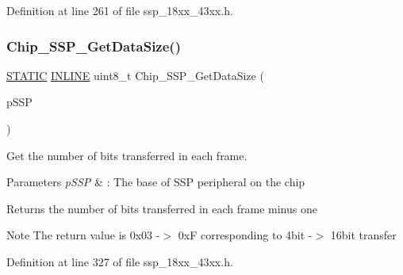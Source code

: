 Definition at line 261 of file ssp\+\_\+18xx\+\_\+43xx.\+h.

\mbox{\label{group___s_s_p__18_x_x__43_x_x_ga421d39f6094d0f335e5acbc3dd5f0b09}} 
\subsubsection{\texorpdfstring{Chip\+\_\+\+S\+S\+P\+\_\+\+Get\+Data\+Size()}{Chip\_SSP\_GetDataSize()}}
{\footnotesize\ttfamily \hyperlink{group___l_p_c___types___public___macros_ga10b2d890d871e1489bb02b7e70d9bdfb}{S\+T\+A\+T\+IC} \hyperlink{spifi__18xx__43xx_8h_a2eb6f9e0395b47b8d5e3eeae4fe0c116}{I\+N\+L\+I\+NE} uint8\+\_\+t Chip\+\_\+\+S\+S\+P\+\_\+\+Get\+Data\+Size (\begin{DoxyParamCaption}\item[{\hyperlink{struct_l_p_c___s_s_p___t}{L\+P\+C\+\_\+\+S\+S\+P\+\_\+T} $\ast$}]{p\+S\+SP }\end{DoxyParamCaption})}



Get the number of bits transferred in each frame. 


\begin{DoxyParams}{Parameters}
{\em p\+S\+SP} & \+: The base of S\+SP peripheral on the chip \\
\hline
\end{DoxyParams}
\begin{DoxyReturn}{Returns}
the number of bits transferred in each frame minus one 
\end{DoxyReturn}
\begin{DoxyNote}{Note}
The return value is 0x03 -\/$>$ 0xF corresponding to 4bit -\/$>$ 16bit transfer 
\end{DoxyNote}


Definition at line 327 of file ssp\+\_\+18xx\+\_\+43xx.\+h.

\mbox{\label{group___s_s_p__18_x_x__43_x_x_ga207244e33021333a66bb04f2bd2f1102}} 
